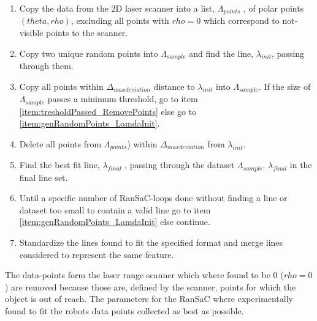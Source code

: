 \begin{enumerate}
\item Copy the data from the 2D laser scanner into a list, $ \Lambda_{points} $ , of polar points $ (theta, rho) $, excluding all points with $ rho = 0 $ which correspond to not-visible points to the scanner.
\item Copy two unique random points into $ \Lambda_{sample} $ and find the line, $ \lambda_{init} $, passing through them. \label{item:genRandomPoints_LamdaInit}
\item Copy all points within $ \Delta_{max deviation} $ distance to $ \lambda_{init} $ into $ \Lambda_{sample} $. If the size of $ \Lambda_{sample} $ passes a minimum threshold, go to item \ref{item:tresholdPassed_RemovePoints} else go to \ref{item:genRandomPoints_LamdaInit}.
\item Delete all points from $ \Lambda_{points} $) within $ \Delta_{max deviation} $ from $ \lambda_{init} $.\label{item:tresholdPassed_RemovePoints}
\item Find the best fit line, $ \lambda_{final} $ , passing through the dataset $ \Lambda_{sample} $. $ \lambda_{final} $ in the final line set.
\item Until a specific number of RanSaC-loops done without finding a line or dataset too small to contain a valid line go to item \ref{item:genRandomPoints_LamdaInit} else continue.
\item Standardize the lines found to fit the specified format and merge lines considered to represent the same feature.
\end{enumerate}

The data-points form the laser range scanner which where found to be 0 ($ rho = 0 $) are removed because those are, defined by the scanner, points for which the object is out of reach. The parameters for the RanSaC where experimentally found to fit the robots data points collected as best as possible.

